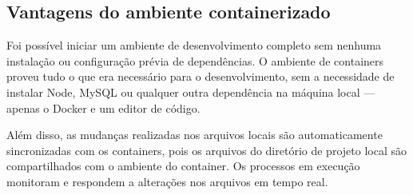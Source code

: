 \subsection{Vantagens do ambiente containerizado}

Foi possível iniciar um ambiente de desenvolvimento completo sem nenhuma instalação ou configuração prévia de dependências. O ambiente de containers proveu tudo o que era necessário para o desenvolvimento, sem a necessidade de instalar Node, MySQL ou qualquer outra dependência na máquina local --- apenas o Docker e um editor de código.

Além disso, as mudanças realizadas nos arquivos locais são automaticamente sincronizadas com os containers, pois os arquivos do diretório de projeto local são compartilhados com o ambiente do container. Os processos em execução monitoram e respondem a alterações nos arquivos em tempo real.
